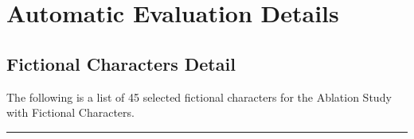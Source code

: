\newpage
\section{Automatic Evaluation Details}
\label{sec:appendix_automatic_eval}
\subsection{Fictional Characters Detail}
\label{sec:appendix_automatic_evalcharacter_list}

The following is a list of 45 selected fictional characters for the Ablation Study with Fictional Characters. 
\noindent\rule{\columnwidth}{0.3mm}
\begin{table}[htbp]
\centering

\vspace{0.5em}


\end{table}
